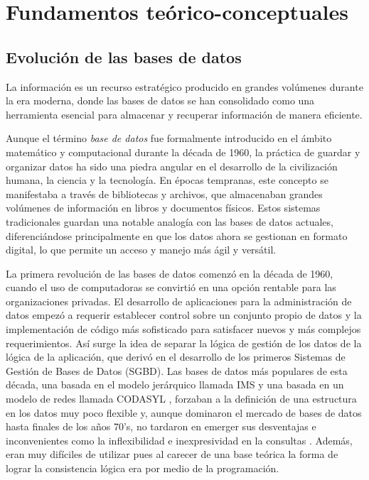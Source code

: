 \chapter{Fundamentos te\'orico-conceptuales}\label{chapter:bi-industry-4.0}

\section{Evolución de las bases de datos}

La información es un recurso estratégico producido en grandes volúmenes durante la era moderna, donde las bases de datos se han consolidado como una herramienta esencial para almacenar y recuperar información de manera eficiente.

Aunque el término \textit{base de datos} fue formalmente introducido en el ámbito matemático y computacional durante la década de 1960, 
la práctica de guardar y organizar datos ha sido una piedra angular en el desarrollo de la civilización humana, la ciencia y la tecnología. En épocas tempranas, este concepto se manifestaba a través de bibliotecas y archivos, que almacenaban grandes volúmenes de información en libros y documentos físicos. Estos sistemas tradicionales guardan una notable analogía con las bases de datos actuales, diferenciándose principalmente en que los datos ahora se gestionan en formato digital, lo que permite un acceso y manejo más ágil y versátil.

La primera revolución de las bases de datos comenzó en la década de 1960, cuando el uso de computadoras se convirtió en una opción rentable para las organizaciones privadas.
El desarrollo de aplicaciones para la administración de datos 
empezó a requerir establecer control sobre un conjunto propio de datos y 
la implementación de código más sofisticado para satisfacer nuevos y más complejos requerimientos. 
Así surge la idea de separar la lógica de gestión de los datos de la lógica de la aplicación, 
que derivó en el desarrollo de los primeros Sistemas de Gestión de Bases de Datos (SGBD). Las bases
de datos más populares de esta década, una basada en el modelo jerárquico llamada IMS \cite{hubbard1986ims} y una basada
en un modelo de redes llamada CODASYL \cite{taylor1976codasyl}, forzaban a la definición de una estructura en los datos muy poco flexible y, 
aunque dominaron el mercado de bases de datos hasta finales de los años 70’s, no tardaron en emerger sus desventajas e inconvenientes como la inflexibilidad e inexpresividad en la consultas \cite{harrison2015next}. 
Además, eran muy difíciles de utilizar pues al carecer de una base teórica la forma de lograr la consistencia lógica era por medio de la programación.

